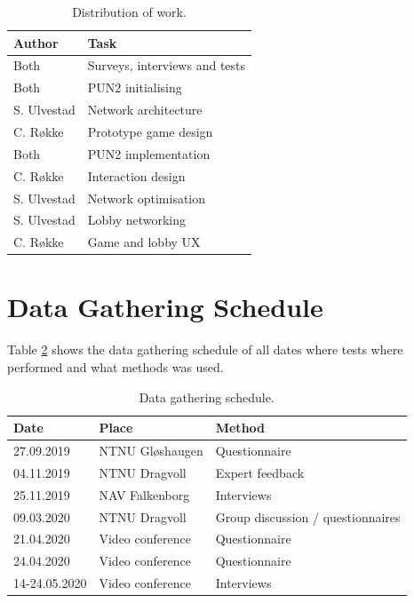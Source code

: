 \begin{table}[H]
\centering
\begin{tabular}{l|l}
\toprule
 \textbf{Author} &  \textbf{Task} \\ 
\midrule
Both & Surveys, interviews and tests \\
Both & PUN2 initialising \\ 
S. Ulvestad & Network architecture  \\ 
C. Røkke & Prototype game design  \\ 
Both &  PUN2 implementation \\
 C. Røkke &  Interaction design \\
 S. Ulvestad & Network optimisation  \\
 S. Ulvestad & Lobby networking \\
 C. Røkke & Game and lobby UX  \\
\bottomrule
\end{tabular}
\caption{Distribution of work.}
\label{table:workDistribution}
\end{table}


\section{Data Gathering Schedule}
Table \ref{table:dataGatheringSchedule} shows the data gathering schedule of all dates where tests where performed and what methods was used. 
 
\begin{table}[H]
\centering
\begin{tabular}{l|l|l}
\toprule
{\textbf{Date}} & { \textbf{Place}} & { \textbf{Method}} \\ 
\midrule
27.09.2019   & NTNU Gløshaugen  &  Questionnaire                \\ 
04.11.2019  & NTNU Dragvoll & Expert feedback                   \\
25.11.2019   & NAV Falkenborg &  Interviews                     \\ 
09.03.2020  & NTNU Dragvoll &  Group discussion / questionnaires\\ 
21.04.2020   & Video conference &  Questionnaire                \\ 
24.04.2020   & Video conference &  Questionnaire                \\ 
14-24.05.2020   & Video conference &  Interviews                \\ 
\bottomrule
\end{tabular}
\caption{Data gathering schedule.}
\label{table:dataGatheringSchedule}
\end{table}


\cleardoublepage